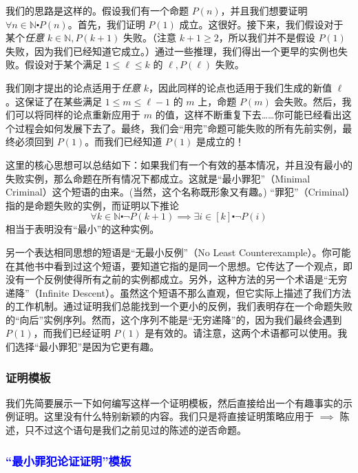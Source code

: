 我们的思路是这样的。假设我们有一个命题 $P(n)$，并且我们想要证明 $\forall n \in \mathbb{N} \centerdot P(n)$。首先，我们证明 $P(1)$ 成立。这很好。接下来，我们假设对于某个\emph{任意} $k \in \mathbb{N}, P(k+1)$ 失败。（注意 $k + 1 \ge 2$，所以我们并不是假设 $P(1)$ 失败，因为我们已经知道它成立。）通过一些推理，我们得出一个更早的实例也失败。假设对于某个满足 $1 \le \ell \le k$ 的 $\ell, P(\ell)$ 失败。

我们刚才提出的论点适用于\emph{任意} $k$，因此同样的论点也适用于我们生成的新值 $\ell$。这保证了在某些满足 $1 \le m \le \ell-1$ 的 $m$ 上，命题 $P(m)$ 会失败。然后，我们可以将同样的论点重新应用于 $m$ 的值，这样不断重复下去……你可能已经看出这个过程会如何发展下去了。最终，我们会``用完''命题可能失败的所有先前实例，最终必须回到 $P(1)$。而我们已经知道 $P(1)$ 是成立的！

这里的核心思想可以总结如下：如果我们有一个有效的基本情况，并且没有最小的失败实例，那么命题在所有情况下都成立。这就是``最小罪犯''（Minimal Criminal）这个短语的由来。(当然，这个名称既形象又有趣。) ``罪犯''（Criminal）指的是命题失败的实例，而证明以下推论
\[\forall k \in \mathbb{N} \centerdot \neg P(k+1) \implies \exists i \in [k] \centerdot \neg P(i)\]
相当于表明没有``最小''的这种实例。

另一个表达相同思想的短语是``无最小反例''（No Least Counterexample）。你可能在其他书中看到过这个短语，要知道它指的是同一个思想。它传达了一个观点，即没有一个反例使得所有之前的实例都成立。另外，这种方法的另一个术语是``无穷递降''（Infinite Descent）。虽然这个短语不那么直观，但它实际上描述了我们方法的工作机制。通过证明我们总能找到一个更小的反例，我们表明存在一个命题失败的``向后''实例序列。然而，这个序列不能是``无穷递降''的，因为我们最终会遇到 $P(1)$，而我们已经证明 $P(1)$ 是有效的。请注意，这两个术语都可以使用。我们选择``最小罪犯''是因为它更有趣。

\subsubsection*{证明模板}

我们先简要展示一下如何编写这样一个证明模板，然后直接给出一个有趣事实的示例证明。这里没有什么特别新颖的内容。我们只是将直接证明策略应用于 $\implies$ 陈述，只不过这个语句是我们之前见过的陈述的逆否命题。

\subsubsection*{\textcolor{blue}{``最小罪犯论证证明''模板}}

